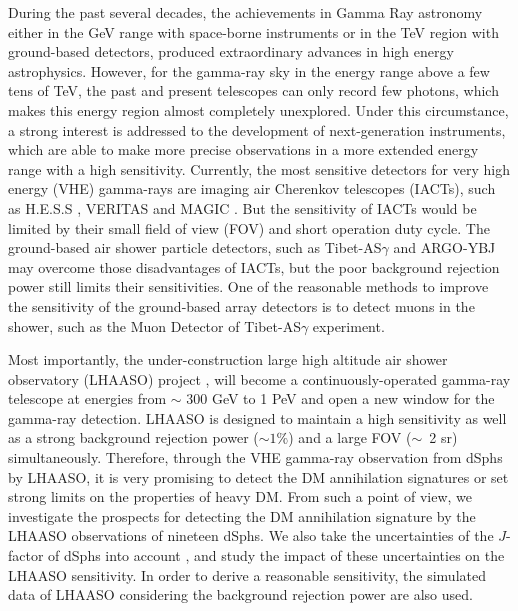 \documentclass[12pt,aps,prd,amsmath,amssymb,showpacs,floats,floatfix,nofootinbib]{revtex4-1}
\begin{document}
During the past several decades, the achievements in Gamma Ray astronomy either in the GeV range with space-borne instruments or in the TeV region with ground-based detectors, produced extraordinary advances in high energy astrophysics. However, for the gamma-ray sky in the energy range above a few tens of TeV, the past and present telescopes can only record few photons, which makes this energy region almost completely unexplored.
Under this circumstance, a strong interest is addressed to the development of next-generation instruments, which are able to make more precise observations in a more extended energy range with a high sensitivity.
Currently, the most sensitive detectors for very high energy (VHE) gamma-rays are imaging air Cherenkov telescopes (IACTs), such as H.E.S.S \cite{Hinton:2008zz}, VERITAS \cite{Furniss:2012zz} and MAGIC \cite{Albert:2007xh}. But the sensitivity of IACTs would be limited by their small field of view (FOV) and short operation duty cycle. The ground-based air shower particle detectors, such as Tibet-AS$\gamma$ and ARGO-YBJ may overcome those disadvantages of IACTs, but the poor background rejection power still limits their sensitivities. One of the reasonable methods to improve the sensitivity of the ground-based array detectors is to detect muons in the shower, such as the Muon Detector of Tibet-AS$\gamma$ experiment.

Most importantly, the under-construction large high altitude air shower observatory (LHAASO) project \cite{Cao:2010zz,Cao:2014rla}, will become a continuously-operated gamma-ray telescope at energies from $\sim$ 300 GeV to 1 PeV and open a new window for the gamma-ray detection.
LHAASO is designed to maintain a high sensitivity as well as a strong background rejection power ($\sim1\%$) and a large FOV ($\sim$~2 sr) simultaneously.
Therefore, through the VHE gamma-ray observation from dSphs by LHAASO, it is very promising to detect the DM annihilation signatures or set strong limits on the properties of heavy DM.
From such a point of view, we investigate the prospects for detecting the DM annihilation signature by the LHAASO observations of nineteen dSphs. We also take the uncertainties of the $J$-factor of dSphs into account \cite{Geringer-Sameth:2014yza,Hutten:2016jko}, and study the impact of these uncertainties on the LHAASO sensitivity. In order to derive a reasonable sensitivity, the simulated data of LHAASO considering the background rejection power are also used.
\end{document}

